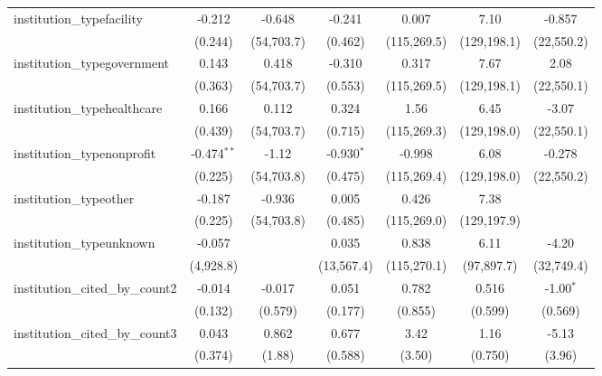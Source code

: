 \begin{tabular}{lcccccc}
   institution\_typefacility             & -0.212        & -0.648      & -0.241        & 0.007        & 7.10         & -0.857\\   
                                         & (0.244)       & (54,703.7)  & (0.462)       & (115,269.5)  & (129,198.1)  & (22,550.2)\\   
   institution\_typegovernment           & 0.143         & 0.418       & -0.310        & 0.317        & 7.67         & 2.08\\   
                                         & (0.363)       & (54,703.7)  & (0.553)       & (115,269.5)  & (129,198.1)  & (22,550.1)\\   
   institution\_typehealthcare           & 0.166         & 0.112       & 0.324         & 1.56         & 6.45         & -3.07\\   
                                         & (0.439)       & (54,703.7)  & (0.715)       & (115,269.3)  & (129,198.0)  & (22,550.1)\\   
   institution\_typenonprofit            & -0.474$^{**}$ & -1.12       & -0.930$^{*}$  & -0.998       & 6.08         & -0.278\\   
                                         & (0.225)       & (54,703.8)  & (0.475)       & (115,269.4)  & (129,198.0)  & (22,550.2)\\   
   institution\_typeother                & -0.187        & -0.936      & 0.005         & 0.426        & 7.38         &   \\   
                                         & (0.225)       & (54,703.8)  & (0.485)       & (115,269.0)  & (129,197.9)  &   \\   
   institution\_typeunknown              & -0.057        &             & 0.035         & 0.838        & 6.11         & -4.20\\   
                                         & (4,928.8)     &             & (13,567.4)    & (115,270.1)  & (97,897.7)   & (32,749.4)\\   
   institution\_cited\_by\_count2        & -0.014        & -0.017      & 0.051         & 0.782        & 0.516        & -1.00$^{*}$\\   
                                         & (0.132)       & (0.579)     & (0.177)       & (0.855)      & (0.599)      & (0.569)\\   
   institution\_cited\_by\_count3        & 0.043         & 0.862       & 0.677         & 3.42         & 1.16         & -5.13\\   
                                         & (0.374)       & (1.88)      & (0.588)       & (3.50)       & (0.750)      & (3.96)\\   

\end{tabular}
